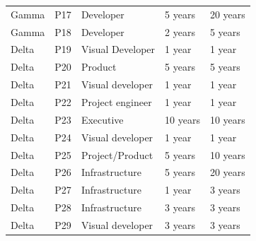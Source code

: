 \documentclass[smallextended]{svjour3}        %
\begin{document}
\begin{table}[!h]
\begin{tabular}{p{1.5cm}p{0.6cm}p{2.5cm}p{3.5cm}p{2cm}}
Gamma & P17 & Developer & 5 years & 20 years\\
Gamma & P18 & Developer & 2 years & 5 years\\
Delta & P19 & Visual Developer & 1 year & 1 year\\
Delta & P20 & Product  & 5 years & 5 years\\
Delta & P21 & Visual developer & 1 year & 1 year\\
Delta & P22 & Project engineer & 1 year & 1 year\\
Delta & P23 & Executive & 10 years & 10 years\\
Delta & P24 & Visual developer & 1 year & 1 year\\
Delta & P25 & Project/Product & 5 years & 10 years\\
Delta & P26 & Infrastructure & 5 years & 20 years\\
Delta & P27 & Infrastructure & 1 year & 3 years\\
Delta & P28 & Infrastructure & 3 years & 3 years\\
Delta & P29 & Visual developer & 3 years & 3 years\\


\bottomrule
\end{tabular}

\end{table}




\end{document}
